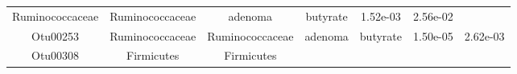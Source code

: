 \documentclass[11pt,]{article}
\begin{document}
\begin{longtable}[]{@{}ccccccc@{}}
\begin{minipage}[t]{0.17\columnwidth}
Ruminococcaceae\strut
\end{minipage} & \begin{minipage}[t]{0.17\columnwidth}\centering\strut
Ruminococcaceae\strut
\end{minipage} & \begin{minipage}[t]{0.09\columnwidth}\centering\strut
adenoma\strut
\end{minipage} & \begin{minipage}[t]{0.11\columnwidth}\centering\strut
butyrate\strut
\end{minipage} & \begin{minipage}[t]{0.09\columnwidth}\centering\strut
1.52e-03\strut
\end{minipage} & \begin{minipage}[t]{0.09\columnwidth}\centering\strut
2.56e-02\strut
\end{minipage}\tabularnewline
\begin{minipage}[t]{0.09\columnwidth}\centering\strut
Otu00253\strut
\end{minipage} & \begin{minipage}[t]{0.17\columnwidth}\centering\strut
Ruminococcaceae\strut
\end{minipage} & \begin{minipage}[t]{0.17\columnwidth}\centering\strut
Ruminococcaceae\strut
\end{minipage} & \begin{minipage}[t]{0.09\columnwidth}\centering\strut
adenoma\strut
\end{minipage} & \begin{minipage}[t]{0.11\columnwidth}\centering\strut
butyrate\strut
\end{minipage} & \begin{minipage}[t]{0.09\columnwidth}\centering\strut
1.50e-05\strut
\end{minipage} & \begin{minipage}[t]{0.09\columnwidth}\centering\strut
2.62e-03\strut
\end{minipage}\tabularnewline
\begin{minipage}[t]{0.09\columnwidth}\centering\strut
Otu00308\strut
\end{minipage} & \begin{minipage}[t]{0.17\columnwidth}\centering\strut
Firmicutes\strut
\end{minipage} & \begin{minipage}[t]{0.17\columnwidth}\centering\strut
Firmicutes\strut
\end{minipage} & \begin{minipage}[t]{0.09\columnwidth}\centering\strut

\end{minipage}
\end{longtable}
\end{document}
